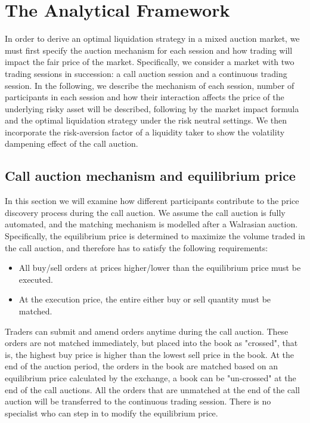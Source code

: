 \section{The Analytical Framework}\label{sec:AnalyticalFramework}

In order to derive an optimal liquidation strategy in a mixed auction market, we must first specify the auction mechanism for each session and how trading will impact the fair price of the market. Specifically, we consider a market with two trading sessions in succession: a call auction session and a continuous trading session. In the following, we describe the mechanism of each session, number of participants in each session and how their interaction affects the price of the underlying risky asset will be described, following by the market impact formula and the optimal liquidation strategy under the risk neutral settings. We then incorporate the risk-aversion factor of a liquidity taker to show the volatility dampening effect of the call auction.

\subsection{Call auction mechanism and equilibrium price}\label{subsec:AnalyticalFrameworkCallAuction}

In this section we will examine how different participants contribute to the price discovery process during the call auction. We assume the call auction is fully automated, and the matching mechanism is modelled after a Walrasian auction. Specifically, the equilibrium price is determined to maximize the volume traded in the call auction, and therefore has to satisfy the following requirements:

\begin{itemize}
  \item All buy/sell orders at prices higher/lower than the equilibrium price must be executed.
  \item At the execution price, the entire either buy or sell quantity must be matched.
\end{itemize}

Traders can submit and amend orders anytime during the call auction. These orders are not matched immediately, but placed into the book as "crossed", that is, the highest buy price is higher than the lowest sell price in the book. At the end of the auction period, the orders in the book are matched based on an equilibrium price calculated by the exchange, a book can be "un-crossed" at the end of the call auctions. All the orders that are unmatched at the end of the call auction will be transferred to the continuous trading session. There is no specialist who can step in to modify the equilibrium price.

